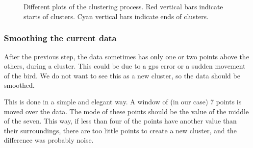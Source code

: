 \begin{figure}
  \centering
   \\
   \\
  \caption{Different plots of the clustering process. Red vertical bars indicate starts of clusters. Cyan vertical bars indicate ends of clusters.}
  \label{fig:clustering}
\end{figure}


\subsubsection{Smoothing the current data}
After the previous step, the data sometimes has only one or two points above the
others, during a cluster. This could be due to a gps error or a sudden movement
of the bird. We do not want to see this as a new cluster, so the data should be
smoothed.

This is done in a simple and elegant way. A window of (in our case) 7 points is
moved over the data. The mode of these points should be the value of the middle
of the seven. This way, if less than four of the points have another value than
their surroundings, there are too little points to create a new cluster, and the
difference was probably noise. 
